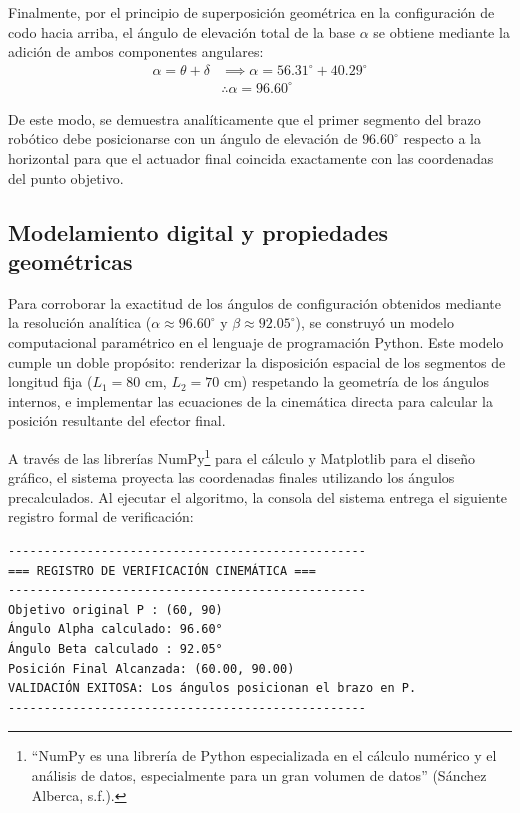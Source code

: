 \documentclass[12pt]{article}
\begin{document}
Finalmente, por el principio de superposición geométrica en la configuración de codo hacia arriba, el ángulo de elevación total de la base $\alpha$ se obtiene mediante la adición de ambos componentes angulares:
\begin{align*}
    \alpha = \theta + \delta &\implies \alpha = 56.31^\circ + 40.29^\circ \\
    &\therefore \alpha = 96.60^\circ
\end{align*}

De este modo, se demuestra analíticamente que el primer segmento del brazo robótico debe posicionarse con un ángulo de elevación de $96.60^\circ$ respecto a la horizontal para que el actuador final coincida exactamente con las coordenadas del punto objetivo.

\subsection{Modelamiento digital y propiedades geométricas}

Para corroborar la exactitud de los ángulos de configuración obtenidos mediante la resolución analítica ($\alpha \approx 96.60^\circ$ y $\beta \approx 92.05^\circ$), se construyó un modelo computacional paramétrico en el lenguaje de programación Python. Este modelo cumple un doble propósito: renderizar la disposición espacial de los segmentos de longitud fija ($L_1 = 80 \text{ cm}$, $L_2 = 70 \text{ cm}$) respetando la geometría de los ángulos internos, e implementar las ecuaciones de la cinemática directa para calcular la posición resultante del efector final.

A través de las librerías NumPy\footnote{``NumPy es una librería de Python especializada en el cálculo numérico y el análisis de datos, especialmente para un gran volumen de datos'' (Sánchez Alberca, s.f.).} para el cálculo y Matplotlib para el diseño gráfico, el sistema proyecta las coordenadas finales utilizando los ángulos precalculados. Al ejecutar el algoritmo, la consola del sistema entrega el siguiente registro formal de verificación:

\begin{verbatim}
--------------------------------------------------
=== REGISTRO DE VERIFICACIÓN CINEMÁTICA ===
--------------------------------------------------
Objetivo original P : (60, 90)
Ángulo Alpha calculado: 96.60°
Ángulo Beta calculado : 92.05°
Posición Final Alcanzada: (60.00, 90.00)
VALIDACIÓN EXITOSA: Los ángulos posicionan el brazo en P.
--------------------------------------------------
\end{verbatim}
\end{document}
